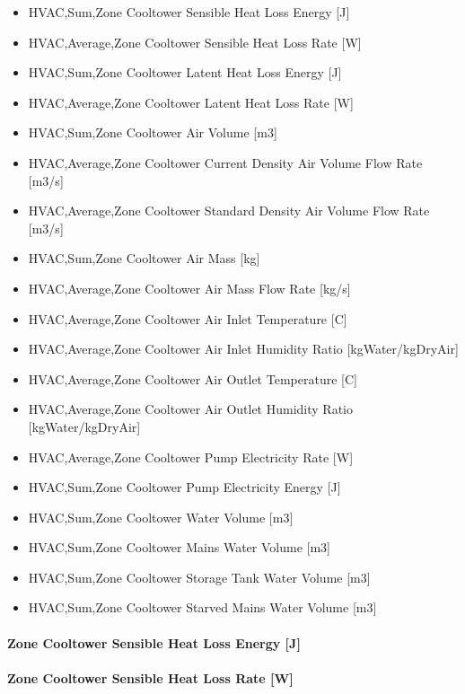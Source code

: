 \begin{itemize}
\item
  HVAC,Sum,Zone Cooltower Sensible Heat Loss Energy {[}J{]}
\item
  HVAC,Average,Zone Cooltower Sensible Heat Loss Rate {[}W{]}
\item
  HVAC,Sum,Zone Cooltower Latent Heat Loss Energy {[}J{]}
\item
  HVAC,Average,Zone Cooltower Latent Heat Loss Rate {[}W{]}
\item
  HVAC,Sum,Zone Cooltower Air Volume {[}m3{]}
\item
  HVAC,Average,Zone Cooltower Current Density Air Volume Flow Rate {[}m3/s{]}
\item
  HVAC,Average,Zone Cooltower Standard Density Air Volume Flow Rate {[}m3/s{]}
\item
  HVAC,Sum,Zone Cooltower Air Mass {[}kg{]}
\item
  HVAC,Average,Zone Cooltower Air Mass Flow Rate {[}kg/s{]}
\item
  HVAC,Average,Zone Cooltower Air Inlet Temperature {[}C{]}
\item
  HVAC,Average,Zone Cooltower Air Inlet Humidity Ratio {[}kgWater/kgDryAir{]}
\item
  HVAC,Average,Zone Cooltower Air Outlet Temperature {[}C{]}
\item
  HVAC,Average,Zone Cooltower Air Outlet Humidity Ratio {[}kgWater/kgDryAir{]}
\item
  HVAC,Average,Zone Cooltower Pump Electricity Rate {[}W{]}
\item
  HVAC,Sum,Zone Cooltower Pump Electricity Energy {[}J{]}
\item
  HVAC,Sum,Zone Cooltower Water Volume {[}m3{]}
\item
  HVAC,Sum,Zone Cooltower Mains Water Volume {[}m3{]}
\item
  HVAC,Sum,Zone Cooltower Storage Tank Water Volume {[}m3{]}
\item
  HVAC,Sum,Zone Cooltower Starved Mains Water Volume {[}m3{]}
\end{itemize}

\paragraph{Zone Cooltower Sensible Heat Loss Energy {[}J{]}}\label{zone-cooltower-sensible-heat-loss-energy-j}

\paragraph{Zone Cooltower Sensible Heat Loss Rate {[}W{]}}\label{zone-cooltower-sensible-heat-loss-rate-w}

